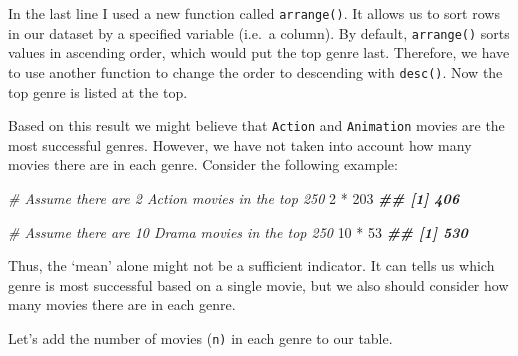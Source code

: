 \documentclass[
]{book}
\newenvironment{Shaded}{\begin{snugshade}}{\end{snugshade}}
\newcommand{\CommentTok}[1]{\textcolor[rgb]{0.56,0.35,0.01}{\textit{#1}}}
\newcommand{\DecValTok}[1]{\textcolor[rgb]{0.00,0.00,0.81}{#1}}
\newcommand{\DocumentationTok}[1]{\textcolor[rgb]{0.56,0.35,0.01}{\textbf{\textit{#1}}}}
\newcommand{\SpecialCharTok}[1]{\textcolor[rgb]{0.00,0.00,0.00}{#1}}
\begin{document}
In the last line I used a new function called \texttt{arrange()}. It allows us to sort rows in our dataset by a specified variable (i.e.~a column). By default, \texttt{arrange()} sorts values in ascending order, which would put the top genre last. Therefore, we have to use another function to change the order to descending with \texttt{desc()}. Now the top genre is listed at the top.

Based on this result we might believe that \texttt{Action} and \texttt{Animation} movies are the most successful genres. However, we have not taken into account how many movies there are in each genre. Consider the following example:

\begin{Shaded}
\begin{Highlighting}[]

\CommentTok{\# Assume there are 2 Action movies in the top 250}
\DecValTok{2} \SpecialCharTok{*} \DecValTok{203}
\DocumentationTok{\#\# [1] 406}

\CommentTok{\# Assume there are 10 Drama movies in the top 250}
\DecValTok{10} \SpecialCharTok{*} \DecValTok{53}
\DocumentationTok{\#\# [1] 530}
\end{Highlighting}
\end{Shaded}

Thus, the `mean' alone might not be a sufficient indicator. It can tells us which genre is most successful based on a single movie, but we also should consider how many movies there are in each genre.

Let's add the number of movies (\texttt{n)} in each genre to our table.
\end{document}

